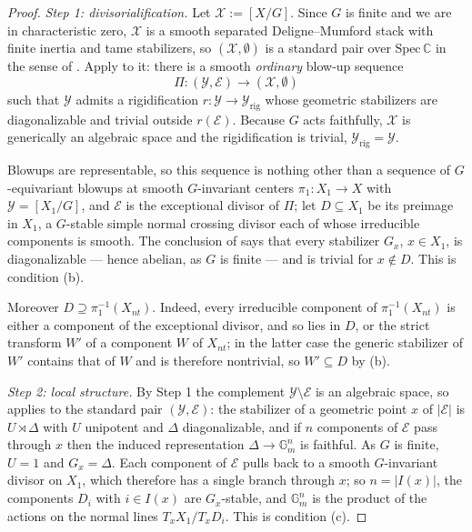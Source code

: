 \documentclass[11pt]{amsart}
\theoremstyle{plain}
\theoremstyle{definition}
\theoremstyle{remark}
\numberwithin{equation}{section}
\begin{document}
\begin{proof}
\emph{Step 1: divisorialification.}
Let $\mathcal{X} := [X/G]$.  Since $G$ is finite and we are in characteristic
zero, $\mathcal{X}$ is a smooth separated Deligne--Mumford stack with finite
inertia and tame stabilizers, so $(\mathcal{X},\emptyset)$ is a standard pair
over $\mathrm{Spec}\, \mathbb{C}$ in the sense of
\cite[Definition~3.5]{BerghRydh}.  Apply
\cite[Theorem~A]{BerghRydh} to it: there is a smooth \emph{ordinary} blow-up
sequence
\[
\Pi : (\mathcal{Y},\mathcal{E}) \to (\mathcal{X},\emptyset)
\]
such that $\mathcal{Y}$ admits a rigidification $r : \mathcal{Y} \to
\mathcal{Y}_{\mathrm{rig}}$ whose geometric stabilizers are diagonalizable and
trivial outside $r(\mathcal{E})$.  Because $G$ acts faithfully, $\mathcal{X}$
is generically an algebraic space and the rigidification is trivial,
$\mathcal{Y}_{\mathrm{rig}} = \mathcal{Y}$.

Blowups are representable, so this sequence is nothing other than a sequence
of $G$-equivariant blowups at smooth $G$-invariant centers
$\pi_1 : X_1 \to X$ with $\mathcal{Y} = [X_1/G]$, and $\mathcal{E}$ is the
exceptional divisor of $\Pi$; let $D \subseteq X_1$ be its preimage in $X_1$,
a $G$-stable simple normal crossing divisor each of whose irreducible
components is smooth.  The conclusion of \cite[Theorem~A]{BerghRydh} says
that every stabilizer $G_x$, $x \in X_1$, is diagonalizable --- hence abelian,
as $G$ is finite --- and is trivial for $x \notin D$.  This is condition (b).

Moreover $D \supseteq \pi_1^{-1}(X_{nt})$.  Indeed, every irreducible
component of $\pi_1^{-1}(X_{nt})$ is either a component of the exceptional
divisor, and so lies in $D$, or the strict transform $W'$ of a component $W$
of $X_{nt}$; in the latter case the generic stabilizer of $W'$ contains that
of $W$ and is therefore nontrivial, so $W' \subseteq D$ by (b).

\emph{Step 2: local structure.}
By Step 1 the complement $\mathcal{Y} \setminus \mathcal{E}$ is an algebraic
space, so \cite[Theorem~C]{BerghRydh} applies to the standard pair
$(\mathcal{Y},\mathcal{E})$: the stabilizer of a geometric point $x$ of
$|\mathcal{E}|$ is $U \rtimes \Delta$ with $U$ unipotent and $\Delta$
diagonalizable, and if $n$ components of $\mathcal{E}$ pass through $x$ then
the induced representation $\Delta \to \mathbb{G}_m^n$ is faithful.  As $G$ is
finite, $U = 1$ and $G_x = \Delta$.  Each component of $\mathcal{E}$ pulls
back to a smooth $G$-invariant divisor on $X_1$, which therefore has a single
branch through $x$; so $n = |I(x)|$, the components $D_i$ with $i \in I(x)$
are $G_x$-stable, and $\mathbb{G}_m^n$ is the product of the actions on the
normal lines $T_xX_1/T_xD_i$.  This is condition (c).


\end{proof}
\end{document}
